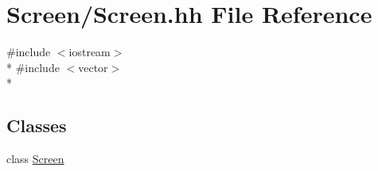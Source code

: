 \hypertarget{Screen_8hh}{\section{Screen/\-Screen.hh File Reference}
\label{Screen_8hh}
}
{\ttfamily \#include $<$iostream$>$}\\*
{\ttfamily \#include $<$vector$>$}\\*
\subsection*{Classes}
\begin{DoxyCompactItemize}
\item 
class \hyperlink{classScreen}{Screen}
\end{DoxyCompactItemize}

